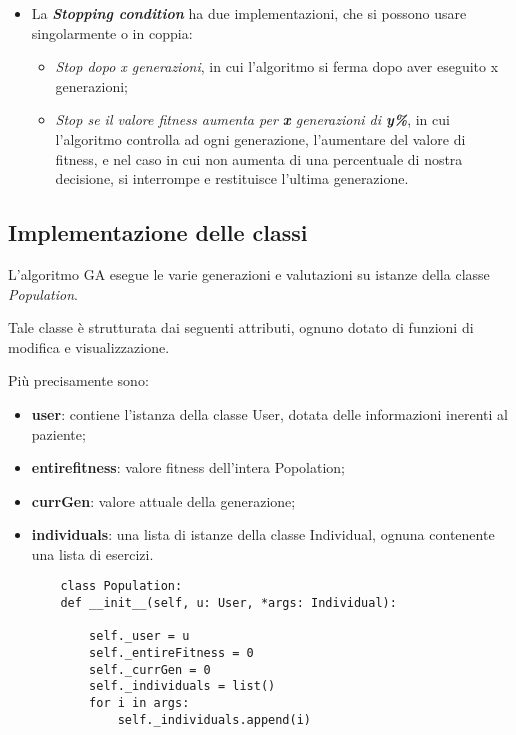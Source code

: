 \documentclass{article}
\begin{document}
\begin{itemize}
\item La \textit{\textbf{Stopping condition}} ha due implementazioni, che si possono usare singolarmente o in coppia:
\begin{itemize}
    \item \textit{Stop dopo x generazioni}, in cui l'algoritmo si ferma dopo aver eseguito x generazioni;
    \item \textit{Stop se il valore fitness aumenta per \textbf{x} generazioni di \textbf{y\%}}, in cui l'algoritmo controlla ad ogni generazione, l'aumentare del valore di fitness, e nel caso in cui non aumenta di una percentuale di nostra decisione, si interrompe e restituisce l'ultima generazione.
\end{itemize}
\end{itemize}

\bigskip

\subsection{Implementazione delle classi}

L'algoritmo GA esegue le varie generazioni e valutazioni su istanze della classe \textit{Population}.

Tale classe è strutturata dai seguenti attributi, ognuno dotato di funzioni di modifica e visualizzazione.

Più precisamente sono:

\begin{itemize}

\item\textbf{user}: contiene l'istanza della classe User, dotata delle informazioni inerenti al paziente;

\item\textbf{entirefitness}: valore fitness dell'intera Popolation;

\item\textbf{currGen}: valore attuale della generazione;

\item\textbf{individuals}: una lista di istanze della classe Individual, ognuna contenente una lista di esercizi.



\begin{lstlisting}
    class Population:
    def __init__(self, u: User, *args: Individual):

        self._user = u
        self._entireFitness = 0
        self._currGen = 0
        self._individuals = list()
        for i in args:
            self._individuals.append(i)
\end{lstlisting}
\end{itemize}
\end{document}
